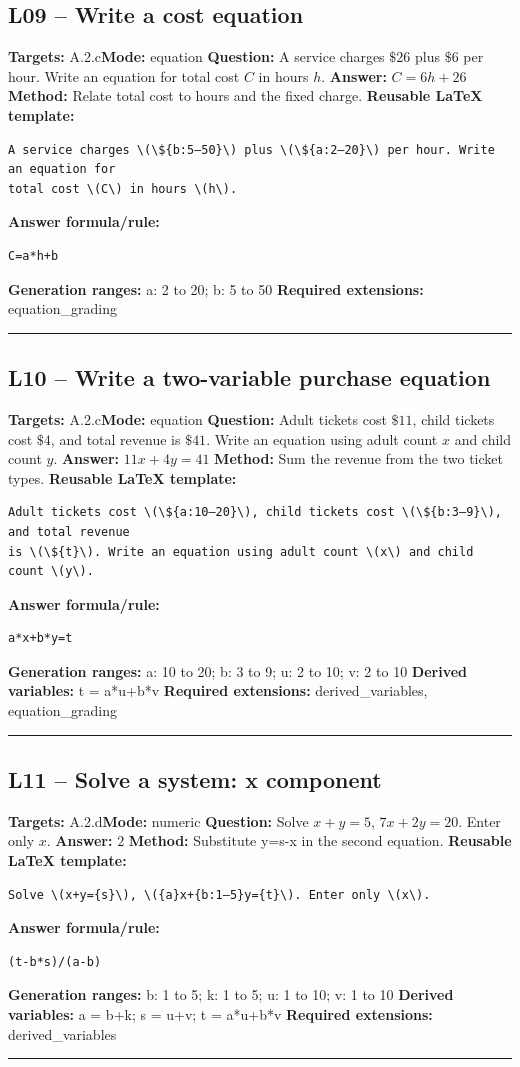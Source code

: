 \documentclass[11pt]{article}
\begin{document}
\subsection{L09 -- Write a cost equation}
\textbf{Targets:} A.2.c\quad\textbf{Mode:} equation
\textbf{Question:} A service charges \(\$26\) plus \(\$6\) per hour. Write an equation for total cost \(C\) in hours \(h\).
\textbf{Answer:} \(C=6h+26\)
\textbf{Method:} Relate total cost to hours and the fixed charge.
\textbf{Reusable LaTeX template:}
\begin{verbatim}
A service charges \(\${b:5–50}\) plus \(\${a:2–20}\) per hour. Write an equation for
total cost \(C\) in hours \(h\).
\end{verbatim}
\textbf{Answer formula/rule:}
\begin{verbatim}
C=a*h+b
\end{verbatim}
\textbf{Generation ranges:} a: 2 to 20; b: 5 to 50
\textbf{Required extensions:} equation\_grading
\medskip\hrule\medskip
\subsection{L10 -- Write a two-variable purchase equation}
\textbf{Targets:} A.2.c\quad\textbf{Mode:} equation
\textbf{Question:} Adult tickets cost \(\$11\), child tickets cost \(\$4\), and total revenue is \(\$41\). Write an equation using adult count \(x\) and child count \(y\).
\textbf{Answer:} \(11x+4y=41\)
\textbf{Method:} Sum the revenue from the two ticket types.
\textbf{Reusable LaTeX template:}
\begin{verbatim}
Adult tickets cost \(\${a:10–20}\), child tickets cost \(\${b:3–9}\), and total revenue
is \(\${t}\). Write an equation using adult count \(x\) and child count \(y\).
\end{verbatim}
\textbf{Answer formula/rule:}
\begin{verbatim}
a*x+b*y=t
\end{verbatim}
\textbf{Generation ranges:} a: 10 to 20; b: 3 to 9; u: 2 to 10; v: 2 to 10
\textbf{Derived variables:} t = a*u+b*v
\textbf{Required extensions:} derived\_variables, equation\_grading
\medskip\hrule\medskip
\subsection{L11 -- Solve a system: x component}
\textbf{Targets:} A.2.d\quad\textbf{Mode:} numeric
\textbf{Question:} Solve \(x+y=5\), \(7x+2y=20\). Enter only \(x\).
\textbf{Answer:} \(2\)
\textbf{Method:} Substitute y=s-x in the second equation.
\textbf{Reusable LaTeX template:}
\begin{verbatim}
Solve \(x+y={s}\), \({a}x+{b:1–5}y={t}\). Enter only \(x\).
\end{verbatim}
\textbf{Answer formula/rule:}
\begin{verbatim}
(t-b*s)/(a-b)
\end{verbatim}
\textbf{Generation ranges:} b: 1 to 5; k: 1 to 5; u: 1 to 10; v: 1 to 10
\textbf{Derived variables:} a = b+k; s = u+v; t = a*u+b*v
\textbf{Required extensions:} derived\_variables
\medskip\hrule\medskip
\end{document}
